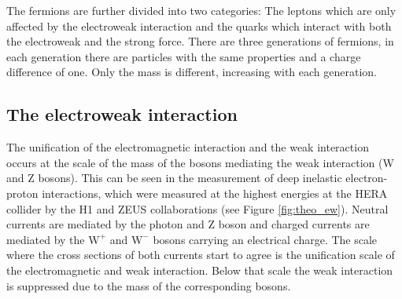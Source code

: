 The fermions are further divided into two categories: The leptons which are only affected by the electroweak interaction and the quarks which interact with both the electroweak and the strong force.
There are three generations of fermions, in each generation there are particles with the same properties and a charge difference of one. Only the mass is different, increasing with each generation.

\subsection{The electroweak interaction}
\label{sec:theo_ew}

The unification of the electromagnetic interaction and the weak interaction occurs at the scale of the mass of the bosons mediating the weak interaction (W and Z bosons).
This can be seen in the measurement of deep inelastic electron-proton interactions, which were measured at the highest energies at the HERA collider by the H1 and ZEUS collaborations \cite{Abramowicz:2015mha} (see Figure \ref{fig:theo_ew}). Neutral currents are mediated by the photon and Z boson and charged currents are
mediated by the $\mathrm{W}^+$ and $\mathrm{W}^-$ bosons carrying an electrical charge. The scale where the cross sections of both currents start to agree is the unification scale of the electromagnetic and weak interaction.
Below that scale the weak interaction is suppressed due to the mass of the corresponding bosons.

